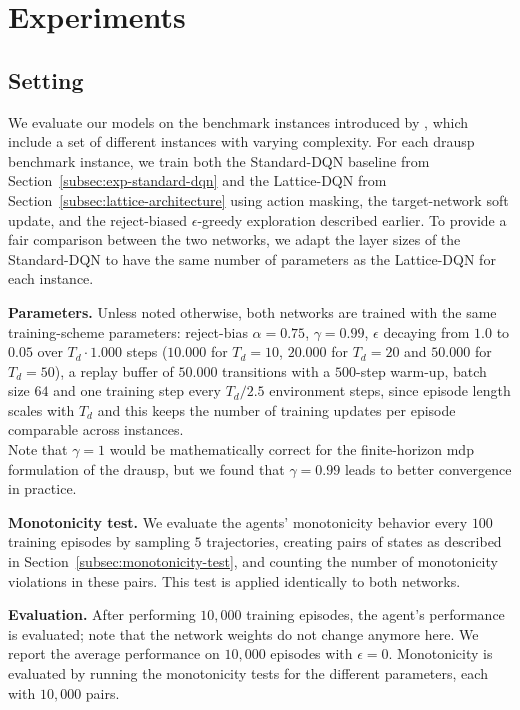\section{Experiments}
\label{sec:experiments}

\subsection{Setting}
\label{subsec:exp-setting}

We evaluate our models on the benchmark instances introduced by \textcite{drausp_lion18}, which include a set of different instances with varying complexity.
For each \acs{drausp} benchmark instance, we train both the Standard-DQN baseline from
Section~\ref{subsec:exp-standard-dqn} and the Lattice-DQN from Section~\ref{subsec:lattice-architecture}
using action masking, the target-network soft update, and the reject-biased $\epsilon$-greedy
exploration described earlier. To provide a fair comparison between the two networks, we adapt the layer sizes of the Standard-DQN to have the same number of parameters as the Lattice-DQN for each instance.

\textbf{Parameters.} Unless noted otherwise, both networks are trained with the same
training-scheme parameters: reject-bias $\alpha=0.75$, $\gamma = 0.99$, $\epsilon$ decaying from
$1.0$ to $0.05$ over $T_d \cdot 1{.}000$ steps ($10{.}000$ for $T_d=10$, $20{.}000$ for $T_d=20$
and $50{.}000$ for $T_d=50$), a replay buffer of $50{.}000$ transitions with a $500$-step warm-up,
batch size $64$ and one training step every $T_d/2.5$ environment steps, since episode length scales
with $T_d$ and this keeps the number of training updates per episode comparable across instances.\\
Note that $\gamma = 1$ would be mathematically correct for the finite-horizon \acs{mdp} formulation of the \acs{drausp}, but we found that $\gamma = 0.99$ leads to better convergence in practice.

\textbf{Monotonicity test.} We evaluate the agents' monotonicity behavior every $100$ training
episodes by sampling $5$ trajectories, creating pairs of states as described in
Section~\ref{subsec:monotonicity-test}, and counting the number of monotonicity violations in
these pairs. This test is applied identically to both networks.

\textbf{Evaluation.} After performing $10{,}000$ training episodes, the agent's performance is evaluated; note that the network
weights do not change anymore here. We report the average performance on $10{,}000$ episodes with
$\epsilon = 0$. Monotonicity is evaluated by running the monotonicity tests for the different
parameters, each with $10{,}000$ pairs.

